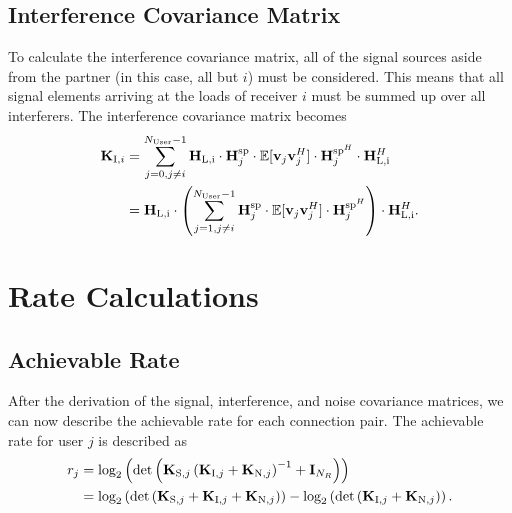\subsection{Interference Covariance Matrix}
\label{sec:int_cov}

To calculate the interference covariance matrix, all of the signal sources aside from the partner (in this case, all but $i$) must be considered.
This means that all signal elements arriving at the loads of receiver $i$ must be summed up over all interferers.
The interference covariance matrix becomes 
\begin{align}
\label{eq:interf_cov}\nonumber
\mat{K}_{\text{I},i}%
 	&= \sum_{j=0,j\neq i}^{N_\text{User}-1} 
	\mat{H}_\text{L,i} \cdot \mat{H}_{j}^{\text{sp}} \cdot 
	\mathbb{E}[\vec{v}_{j}\vec{v}_{j}^H] \cdot 
	\mat{H}_{j}^{\text{sp}^H} \cdot \mat{H}_\text{L,i}^H\\
	&= \mat{H}_\text{L,i} \cdot\left(\sum_{j=1,j\neq i}^{N_\text{User}-1} 
	\mat{H}_{j}^{\text{sp}} \cdot 
	\mathbb{E}[\vec{v}_{j}\vec{v}_{j}^H] \cdot 
	\mat{H}_{j}^{\text{sp}^H}\right) \cdot \mat{H}_\text{L,i}^H.
\end{align}




\section{Rate Calculations}
\label{sec:rates}

\subsection{Achievable Rate}
\label{sec:achiev_rate}
After the derivation of the signal, interference, and noise covariance matrices, we can now describe the achievable rate for each connection pair.
The achievable rate for user $j$ is described as
\begin{align}
\label{eq:achiev_rate}
\nonumber
r_j &= \text{log}_2\left(\text{det}\left(\mathbf{K}_{\text{S},j}\left(\mathbf{K}_{\text{I},j}+\mathbf{K}_{\text{N},j}\right)^{-1}+\mathbf{I}_{N_R}\right)\right)\\
 &=\text{log}_2\left(
	\text{det}\left(\mathbf{K}_{\text{S},j}+
		\mathbf{K}_{\text{I},j}+\mathbf{K}_{\text{N},j}\right)\right) -
	\text{log}_2\left(\text{det}\left(\mathbf{K}_{\text{I},j}+\mathbf{K}_{\text{N},j}\right)\right).
\end{align}

